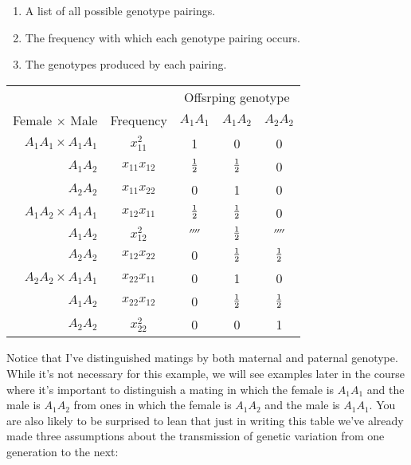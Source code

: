 \documentclass[12pt]{article}
\begin{document}
\begin{enumerate}

\item A list of all possible genotype pairings.

\item The frequency with which each genotype pairing occurs.

\item The genotypes produced by each pairing.

\end{enumerate}

\begin{center}
\begin{tabular}{rcccc}
\hline\hline
                       &           & \multicolumn{3}{c}{Offsrping genotype} \\
Female $\times$ Male   & Frequency     & $A_1A_1$ & $A_1A_2$ & $A_2A_2$ \\
\hline
$A_1A_1 \times A_1A_1$ & $x_{11}^2$     &        1 &        0 &        0 \\
              $A_1A_2$ & $x_{11}x_{12}$ &    $\frac{1}{2}$ &    $\frac{1}{2}$ &        0 \\
              $A_2A_2$ & $x_{11}x_{22}$ &        0 &        1 &        0 \\
$A_1A_2 \times A_1A_1$ & $x_{12}x_{11}$ &    $\frac{1}{2}$ &    $\frac{1}{2}$ &        0 \\
              $A_1A_2$ & $x_{12}^2$     &  $\fourth$ &    $\frac{1}{2}$ &  $\fourth$ \\
              $A_2A_2$ & $x_{12}x_{22}$ &        0 &    $\frac{1}{2}$ &    $\frac{1}{2}$ \\
$A_2A_2 \times A_1A_1$ & $x_{22}x_{11}$ &        0 &        1 &        0 \\
              $A_1A_2$ & $x_{22}x_{12}$ &        0 &    $\frac{1}{2}$ &    $\frac{1}{2}$ \\
              $A_2A_2$ & $x_{22}^2$     &        0 &         0 &
                       1 \\
\hline
\end{tabular}
\end{center}
Notice that I've distinguished matings by both maternal and paternal
genotype. While it's not necessary for this example, we will see
examples later in the course where it's important to distinguish a
mating in which the female is $A_1A_1$ and the male is $A_1A_2$ from
ones in which the female is $A_1A_2$ and the male is $A_1A_1$. You are
also likely to be surprised to lean that just in writing this table
we've already made three assumptions about the transmission of genetic
variation from one generation to the next:
\end{document}
